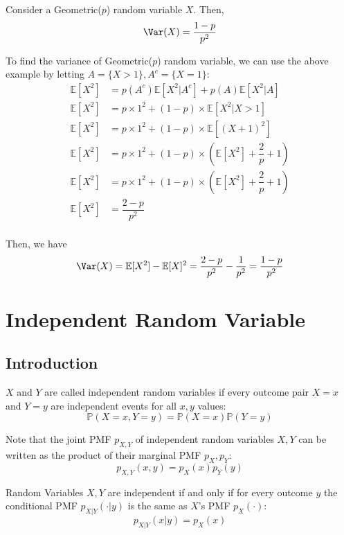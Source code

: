 Consider a Geometric(\(p\)) random variable \(X\). Then,
\[
    \Var(X) = \dfrac{1 - p}{p^{2}}
\]

\newpage
To find the variance of Geometric(\(p\)) random variable, we can use the above example by letting \(A = \{X > 1\}, A^c = \{X = 1\}\):
\[
\begin{aligned}
    \mathbb{E}[X^2] &= p(A^c)\mathbb{E}[X^2 \vert A^c] + p(A)\mathbb{E}[X^2 \vert A] \\
    \mathbb{E}[X^2] &= p \times 1^2 + (1 - p) \times \mathbb{E}[X^2 \vert X > 1] \\
    \mathbb{E}[X^2] &= p \times 1^2 + (1 - p) \times \mathbb{E}[(X + 1)^2] \\
    \mathbb{E}[X^2] &= p \times 1^2 + (1 - p) \times (\mathbb{E}[X^2] + \dfrac{2}{p} + 1) \\
    \mathbb{E}[X^2] &= p \times 1^2 + (1 - p) \times (\mathbb{E}[X^2] + \dfrac{2}{p} + 1) \\
    \mathbb{E}[X^2] &= \dfrac{2 - p}{p^2} \\
\end{aligned}
\]

Then, we have 
\[
    \Var(X) = \mathbb{E}[X^2] - \mathbb{E}[X]^2 = \dfrac{2 - p}{p^2} - \dfrac{1}{p^2} = \dfrac{1 - p}{p^{2}}
\]

\section{Independent Random Variable}
\subsection{Introduction}
\begin{definition}
    \(X\) and \(Y\) are called independent random variables if every outcome pair \(X = x\) and \(Y = y\) are independent events for all \(x, y\) values: 
    \[
        \mathbb{P}(X = x, Y = y) = \mathbb{P}(X = x)\mathbb{P}(Y = y)
    \]

    \begin{remark}
        Note that the joint PMF \(p_{X, Y}\)  of independent random variables \(X, Y\) can be written as the product of their marginal PMF \(p_X, p_Y\): 
        \[
            p_{X, Y}(x, y) = p_X(x)p_Y(y)
        \]
    \end{remark}
\end{definition}

Random Variables \(X, Y\) are independent if and only if for every outcome \(y\)  the conditional PMF \(p_{X \vert Y} (\cdot \vert y)\) is the same as \(X\)’s PMF \(p_X (\cdot)\): 
\[
    p_{X \vert Y} (x \vert y) = p_X(x)
\]

